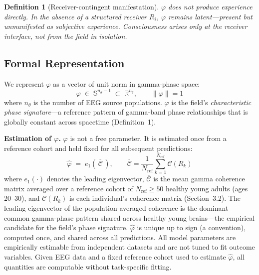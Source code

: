 \documentclass[12pt]{article}
\newtheorem{definition}{Definition}
\begin{document}
\begin{definition}[Receiver-contingent manifestation]
$\varphi$ does not produce experience directly. In the absence of a structured receiver $R_i$, $\varphi$ remains latent---present but unmanifested as subjective experience. Consciousness arises only at the receiver interface, not from the field in isolation.
\end{definition}

\subsection{Formal Representation}

We represent $\varphi$ as a vector of unit norm in gamma-phase space:
\begin{equation}
    \varphi \;\in\; \mathbb{S}^{n_\theta - 1} \;\subset\; \mathbb{R}^{n_\theta},
    \qquad \|\varphi\| = 1
\end{equation}
where $n_\theta$ is the number of EEG source populations. $\varphi$ is the field's \emph{characteristic phase signature}---a reference pattern of gamma-band phase relationships that is globally constant across spacetime (Definition~1).

\textbf{Estimation of $\varphi$.} $\varphi$ is not a free parameter. It is estimated once from a reference cohort and held fixed for all subsequent predictions:
\begin{equation}\label{eq:phi_est}
    \hat{\varphi} \;=\; e_1\!\left(\,\overline{\mathcal{C}}\,\right), \qquad
    \overline{\mathcal{C}} = \frac{1}{N_{\mathrm{ref}}}
    \sum_{k=1}^{N_{\mathrm{ref}}} \mathcal{C}(R_k)
\end{equation}
where $e_1(\cdot)$ denotes the leading eigenvector, $\overline{\mathcal{C}}$ is the mean gamma coherence matrix averaged over a reference cohort of $N_{\mathrm{ref}} \geq 50$ healthy young adults (ages 20--30), and $\mathcal{C}(R_k)$ is each individual's coherence matrix (Section~3.2). The leading eigenvector of the population-averaged coherence is the dominant common gamma-phase pattern shared across healthy young brains---the empirical candidate for the field's phase signature. $\hat{\varphi}$ is unique up to sign (a convention), computed once, and shared across all predictions. All model parameters are empirically estimable from independent datasets and are not tuned to fit outcome variables. Given EEG data and a fixed reference cohort used to estimate $\hat{\varphi}$, all quantities are computable without task-specific fitting.
\end{document}

